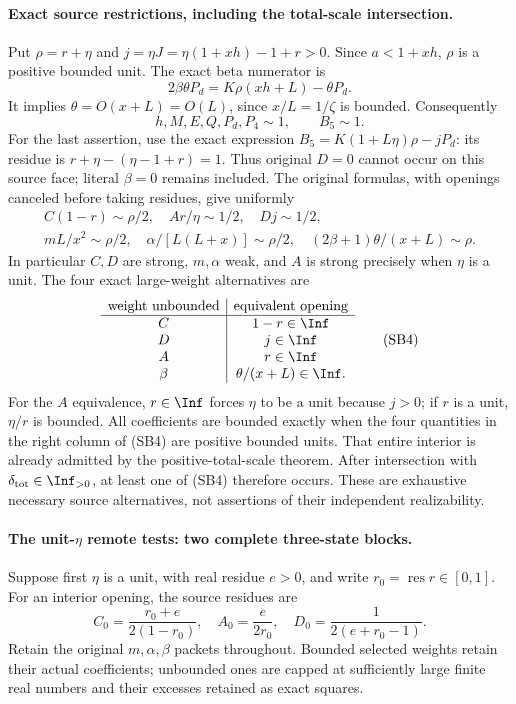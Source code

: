\paragraph{Exact source restrictions, including the total-scale intersection.}
Put $\rho=r+\eta$ and $j=\eta J=\eta(1+xh)-1+r>0$.
Since $a<1+xh$, $\rho$ is a positive bounded unit. The exact beta
numerator is
\[
 2\beta\theta P_d=K\rho(xh+L)-\theta P_d.       \tag{SB1}
\]
It implies $\theta=O(x+L)=O(L)$, since $x/L=1/\zeta$ is bounded.
Consequently
\[
 h,M,E,Q,P_d,P_4\sim1,\qquad B_5\sim1.           \tag{SB2}
\]
For the last assertion, use the exact expression
$B_5=K(1+L\eta)\rho-jP_d$: its residue is
$r+\eta-(\eta-1+r)=1$. Thus original $D=0$ cannot occur on
this source face; literal $\beta=0$ remains included.
The original formulas, with openings canceled before taking residues,
give uniformly
\[
\begin{gathered}
 C(1-r)\sim\rho/2,\quad Ar/\eta\sim1/2,
 \quad Dj\sim1/2,\\
 mL/x^2\sim\rho/2,\quad
 \alpha/[L(L+x)]\sim\rho/2,\quad
 (2\beta+1)\theta/(x+L)\sim\rho.
\end{gathered}                                         \tag{SB3}
\]
In particular $C,D$ are strong, $m,\alpha$ weak, and $A$ is strong
precisely when $\eta$ is a unit. The four exact large-weight
alternatives are
\[
\begin{array}{c|c}
\text{weight unbounded}&\text{equivalent opening}\\\hline
C&1-r\in\Inf\\
D&j\in\Inf\\
A&r\in\Inf\\
\beta&\theta/(x+L)\in\Inf.
\end{array}                                                   \tag{SB4}
\]
For the $A$ equivalence, $r\in\Inf$ forces $\eta$ to be a unit
because $j>0$; if $r$ is a unit, $\eta/r$ is bounded.
All coefficients are bounded exactly when the four quantities in
the right column of (SB4) are positive bounded units. That entire
interior is already admitted by the positive-total-scale theorem.
After intersection with $\delta_{\rm tot}\in\Inf_{>0}$, at least
one of (SB4) therefore occurs. These are exhaustive necessary source
alternatives, not assertions of their independent realizability.

\paragraph{The unit-$\eta$ remote tests: two complete three-state blocks.}
Suppose first $\eta$ is a unit, with real residue $e>0$, and write
$r_0=\operatorname{res}r\in[0,1]$. For an interior opening,
the source residues are
\[
 C_0=\frac{r_0+e}{2(1-r_0)},\quad
 A_0=\frac e{2r_0},\quad D_0=\frac1{2(e+r_0-1)}.       \tag{SB5}
\]
Retain the original $m,\alpha,\beta$ packets throughout. Bounded
selected weights retain their actual coefficients; unbounded ones
are capped at sufficiently large finite real numbers and their
excesses retained as exact squares.

